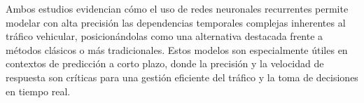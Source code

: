 Ambos estudios evidencian cómo el uso de redes neuronales recurrentes permite modelar con alta precisión las dependencias temporales complejas inherentes al tráfico vehicular, posicionándolas como una alternativa destacada frente a métodos clásicos o más tradicionales. Estos modelos son especialmente útiles en contextos de predicción a corto plazo, donde la precisión y la velocidad de respuesta son críticas para una gestión eficiente del tráfico y la toma de decisiones en tiempo real.

\begin{comment}
\subsubsection{Redes convolucionales}

Las \acrlong{cnn} son una clase de modelos de aprendizaje profundo diseñados para procesar datos con una estructura de tipo rejilla, como imágenes o series temporales espaciales. Su arquitectura se compone de capas convolucionales que aplican filtros para extraer características locales, seguidas de capas de agrupamiento y, finalmente, capas completamente conectadas para la toma de decisiones.​

En el contexto del tráfico vehicular, las \acrshort{cnn} son particularmente útiles para modelar la relación espacial entre diferentes segmentos de carretera y capturar patrones temporales en los datos de flujo de tráfico. Al representar los datos de tráfico en forma de matrices que reflejan la intensidad del tráfico en diferentes ubicaciones y momentos, las \acrshort{cnn} pueden aprender representaciones jerárquicas que facilitan la predicción precisa del flujo de tráfico.

La predicción precisa del flujo de tráfico es esencial para la gestión eficiente de las redes de transporte. Las \acrshort{cnn} permiten modelar las complejas interacciones espaciales y temporales presentes en los datos de tráfico, lo que resulta en predicciones más precisas y robustas. Además, su capacidad para manejar grandes volúmenes de datos y aprender características discriminativas las hace adecuadas para aplicaciones en tiempo real y sistemas de transporte inteligentes.

En el estudio \textit{WT-2DCNN: A convolutional neural network traffic flow prediction model} los autores \cite{forecastCnnWavelet} proponen un modelo que combina la transformada wavelet para la reconstrucción y descomposición de datos con una red neuronal convolucional bidimensional (2DCNN). Este enfoque permite manejar el ruido presente en los datos de tráfico y capturar características espaciales y temporales de manera más efectiva.​


\end{comment}
